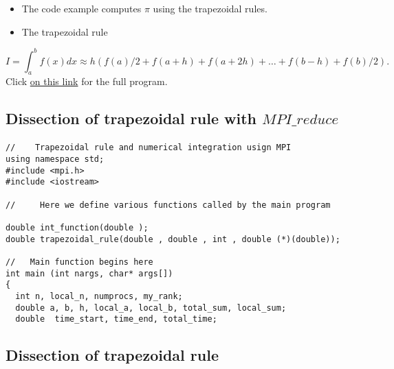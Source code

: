 \documentclass[%
oneside,                 %
final,                   %
10pt]{article}
\begin{document}
\begin{itemize}
\item The code example computes $\pi$ using the trapezoidal rules.

\item The trapezoidal rule
\end{itemize}

\noindent
\[
   I=\int_a^bf(x) dx\approx h\left(f(a)/2 + f(a+h) +f(a+2h)+\dots +f(b-h)+ f(b)/2\right).
\]
Click \href{{https://github.com/CompPhysics/ComputationalPhysics2/blob/gh-pages/doc/Programs/LecturePrograms/programs/MPI/chapter07/program6.cpp}}{on this link} for the full program.



\subsection*{Dissection of trapezoidal rule with $MPI\_reduce$}

\paragraph{}

\begin{verbatim}
//    Trapezoidal rule and numerical integration usign MPI
using namespace std;
#include <mpi.h>
#include <iostream>

//     Here we define various functions called by the main program

double int_function(double );
double trapezoidal_rule(double , double , int , double (*)(double));

//   Main function begins here
int main (int nargs, char* args[])
{
  int n, local_n, numprocs, my_rank; 
  double a, b, h, local_a, local_b, total_sum, local_sum;   
  double  time_start, time_end, total_time;
\end{verbatim}



\subsection*{Dissection of trapezoidal rule}

\paragraph{}
\end{document}
